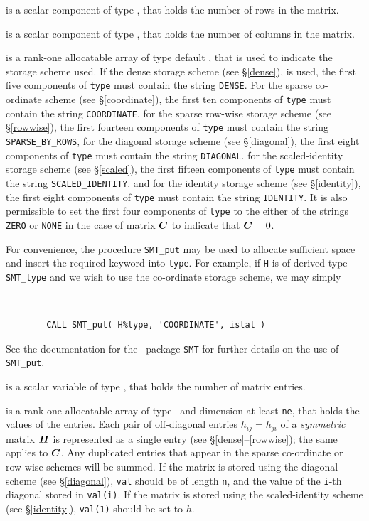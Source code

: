 \documentclass{galahad}
\begin{document}
\begin{description}

 is a scalar component of type \integer,
that holds the number of rows in the matrix.

 is a scalar component of type \integer,
that holds the number of columns in the matrix.

 is a rank-one allocatable array of type default \character, that
is used to indicate the storage scheme used. If the dense storage scheme
(see \S\ref{dense}), is used,
the first five components of {\tt type} must contain the
string {\tt DENSE}.
For the sparse co-ordinate scheme (see \S\ref{coordinate}),
the first ten components of {\tt type} must contain the
string {\tt COORDINATE},
for the sparse row-wise storage scheme (see \S\ref{rowwise}),
the first fourteen components of {\tt type} must contain the
string {\tt SPARSE\_BY\_ROWS},
for the diagonal storage scheme (see \S\ref{diagonal}),
the first eight components of {\tt type} must contain the
string {\tt DIAGONAL}.
for the scaled-identity storage scheme (see \S\ref{scaled}),
the first fifteen components of {\tt type} must contain the
string {\tt SCALED\_IDENTITY}.
and for the identity storage scheme (see \S\ref{identity}),
the first eight components of {\tt type} must contain the
string {\tt IDENTITY}.
It is also permissible to set
the first four components of {\tt type} to the either of the strings
{\tt ZERO} or {\tt NONE}
in the case of matrix ${\bm{C}}$ to indicate that ${\bm{C}} = 0$.

For convenience, the procedure {\tt SMT\_put}
may be used to allocate sufficient space and insert the required keyword
into {\tt type}.
For example, if {\tt H} is of derived type {\tt SMT\_type}
and we wish to use the co-ordinate storage scheme, we may simply
{\tt
\begin{verbatim}
        CALL SMT_put( H%type, 'COORDINATE', istat )
\end{verbatim}
}
\noindent
See the documentation for the \galahad\ package {\tt SMT}
for further details on the use of {\tt SMT\_put}.

 is a scalar variable of type \integer, that
holds the number of matrix entries.

 is a rank-one allocatable array of type \realdp\,
and dimension at least {\tt ne}, that holds the values of the entries.
Each pair of off-diagonal entries $h_{ij} = h_{ji}$ of a {\em symmetric}
matrix ${\bm{H}}$ is represented as a single entry
(see \S\ref{dense}--\ref{rowwise}); the same applies to ${\bm{C}}$.
Any duplicated entries that appear in the sparse
co-ordinate or row-wise schemes will be summed.
If the matrix is stored using the diagonal scheme (see \S\ref{diagonal}),
{\tt val} should be of length {\tt n}, and the value of the {\tt i}-th
diagonal stored in {\tt val(i)}.
If the matrix is stored using the scaled-identity scheme (see \S\ref{identity}),
{\tt val(1)} should be set to $h$.


\end{description}
\end{document}
